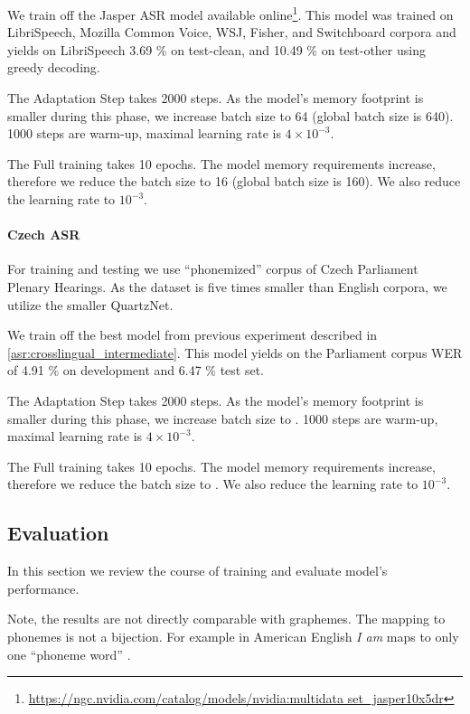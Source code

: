 We train off the Jasper ASR model available online\footnote{\url{https://ngc.nvidia.com/catalog/models/nvidia:multidata set_jasper10x5dr}}. This model was trained on LibriSpeech, Mozilla Common Voice, WSJ, Fisher, and Switchboard corpora and yields on LibriSpeech 3.69 \% on test-clean, and 10.49 \% on test-other using greedy decoding.

The Adaptation Step takes 2000 steps. As the model's memory footprint is smaller during this phase, we increase batch size to 64 (global batch size is 640). 1000 steps are warm-up, maximal learning rate is $4 \times 10^{-3}$.

The Full training takes 10 epochs. The model memory requirements increase, therefore we reduce the batch size to 16 (global batch size is 160). We also reduce the learning rate to $10^{-3}$.

\paragraph{Czech ASR}
For training and testing we use ``phonemized'' corpus of Czech Parliament Plenary Hearings. As the dataset is five times smaller than English corpora, we utilize the smaller QuartzNet.

We train off the best model from previous experiment described in \cref{asr:crosslingual_intermediate}. This model yields on the Parliament corpus WER of 4.91 \% on development and 6.47 \% test set.

The Adaptation Step takes 2000 steps. As the model's memory footprint is smaller during this phase, we increase batch size to . 1000 steps are warm-up, maximal learning rate is $4 \times 10^{-3}$.

The Full training takes 10 epochs. The model memory requirements increase, therefore we reduce the batch size to . We also reduce the learning rate to $10^{-3}$.

\subsection{Evaluation}
\label{asr:phon:eval}
In this section we review the course of training and evaluate model's performance.

Note, the results are not directly comparable with graphemes. The mapping to phonemes is not a bijection. For example in American English \emph{I am} maps to only one ``phoneme word'' \textipa{[aI\ae m]}. 

